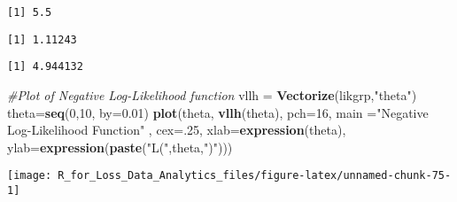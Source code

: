 \documentclass[]{book}
\newenvironment{Shaded}{\begin{snugshade}}{\end{snugshade}}
\newcommand{\KeywordTok}[1]{\textcolor[rgb]{0.13,0.29,0.53}{\textbf{#1}}}
\newcommand{\DataTypeTok}[1]{\textcolor[rgb]{0.13,0.29,0.53}{#1}}
\newcommand{\DecValTok}[1]{\textcolor[rgb]{0.00,0.00,0.81}{#1}}
\newcommand{\FloatTok}[1]{\textcolor[rgb]{0.00,0.00,0.81}{#1}}
\newcommand{\StringTok}[1]{\textcolor[rgb]{0.31,0.60,0.02}{#1}}
\newcommand{\CommentTok}[1]{\textcolor[rgb]{0.56,0.35,0.01}{\textit{#1}}}
\newcommand{\OperatorTok}[1]{\textcolor[rgb]{0.81,0.36,0.00}{\textbf{#1}}}
\newcommand{\NormalTok}[1]{#1}
\theoremstyle{definition}
\theoremstyle{definition}
\theoremstyle{definition}
\theoremstyle{remark}
\begin{document}
\begin{verbatim}
[1] 5.5
\end{verbatim}

\begin{Shaded}
\end{Shaded}

\begin{verbatim}
[1] 1.11243
\end{verbatim}

\begin{Shaded}
\end{Shaded}

\begin{verbatim}
[1] 4.944132
\end{verbatim}

\begin{Shaded}
\begin{Highlighting}[]
\CommentTok{#Plot of Negative Log-Likelihood function }
\NormalTok{vllh =}\StringTok{ }\KeywordTok{Vectorize}\NormalTok{(likgrp,}\StringTok{"theta"}\NormalTok{)}
\NormalTok{theta=}\KeywordTok{seq}\NormalTok{(}\DecValTok{0}\NormalTok{,}\DecValTok{10}\NormalTok{, }\DataTypeTok{by=}\FloatTok{0.01}\NormalTok{)}
\KeywordTok{plot}\NormalTok{(theta, }\KeywordTok{vllh}\NormalTok{(theta), }\DataTypeTok{pch=}\DecValTok{16}\NormalTok{, }\DataTypeTok{main =}\StringTok{"Negative Log-Likelihood Function"}\NormalTok{ , }\DataTypeTok{cex=}\NormalTok{.}\DecValTok{25}\NormalTok{, }
     \DataTypeTok{xlab=}\KeywordTok{expression}\NormalTok{(theta), }\DataTypeTok{ylab=}\KeywordTok{expression}\NormalTok{(}\KeywordTok{paste}\NormalTok{(}\StringTok{"L("}\NormalTok{,theta,}\StringTok{")"}\NormalTok{)))}
\end{Highlighting}
\end{Shaded}

\begin{center}\texttt{[image: R\_for\_Loss\_Data\_Analytics\_files/figure-latex/unnamed-chunk-75-1]} \end{center}
\end{document}
